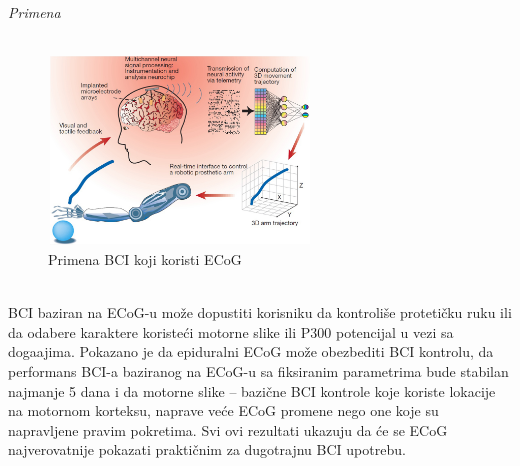 \documentclass[conference]{IEEEtran}
\begin{document}
\\
\\
\textit{Primena} \\
\\
\begin{figure}[htp]
\centerline{\includegraphics[width=7cm, height=5cm]{fneng-03-00112-g001.jpg}}
\caption{Primena BCI koji koristi ECoG}
\label{Slika}
\end{figure}\\
BCI baziran na ECoG-u može dopustiti korisniku da kontroliše protetičku ruku ili da odabere karaktere koristeći motorne slike ili P300 potencijal u vezi sa doga\dj ajima. Pokazano je da epiduralni ECoG može obezbediti BCI kontrolu, da performans BCI-a baziranog na ECoG-u sa fiksiranim parametrima bude stabilan najmanje 5 dana i da motorne slike – bazične BCI kontrole koje koriste lokacije na motornom korteksu, naprave veće ECoG promene nego one koje su napravljene pravim pokretima. Svi ovi rezultati ukazuju da će se ECoG najverovatnije pokazati praktičnim za dugotrajnu BCI upotrebu.
\\
\end{document}

